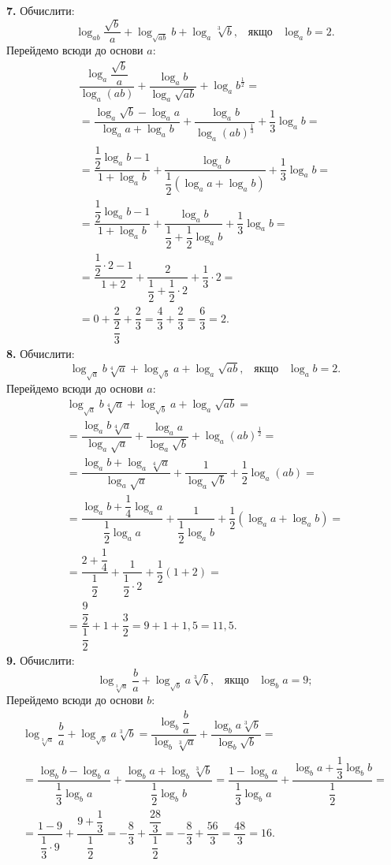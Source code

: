 \textbf{7.} Обчислити:
$$
\log_{ab}\dfrac{\sqrt{b}}{a}+\log_{\sqrt{ab}}b+\log_{a}\sqrt[3]{b}, \;\;\; \mbox{якщо} \;\;\; \log_{a}b=2.
$$
Перейдемо всюди до основи $a$:
\begin{multline*}
\dfrac{\log_{a}\dfrac{\sqrt{b}}{a}}{\log_{a}(ab)}+\dfrac{\log_{a}b}{\log_{a}\sqrt{ab}}+\log_{a}b^{\frac{1}{2}}=\\
=\dfrac{\log_{a}\sqrt{b}-\log_{a}a}{\log_{a}a+\log_{a}b}+\dfrac{\log_{a}b}{\log_{a}(ab)^{\frac{1}{3}}}+\dfrac{1}{3}\log_{a}b=\\
=\dfrac{\dfrac{1}{2}\log_{a}b-1}{1+\log_{a}b}+\dfrac{\log_{a}b}{\dfrac{1}{2}\left(\log_{a}a+\log_{a}b\right)}+\dfrac{1}{3}\log_{a}b=\\
=\dfrac{\dfrac{1}{2}\log_{a}b-1}{1+\log_{a}b}+\dfrac{\log_{a}b}{\dfrac{1}{2}+\dfrac{1}{2}\log_{a}b}+\dfrac{1}{3}\log_{a}b=\\
=\dfrac{\dfrac{1}{2}\cdot2-1}{1+2}+\dfrac{2}{\dfrac{1}{2}+\dfrac{1}{2}\cdot2}+\dfrac{1}{3}\cdot2=\\
=0+\dfrac{2}{\dfrac{2}{3}}+\dfrac{2}{3}=\dfrac{4}{3}+\dfrac{2}{3}=\dfrac{6}{3}=2.
\end{multline*}
\textbf{8.} Обчислити:
$$
\log_{\sqrt{a}}b\sqrt[4]{a}+\log_{\sqrt{b}}a+\log_{a}\sqrt{ab}, \;\;\; \mbox{якщо} \;\;\; \log_{a}b=2.
$$
Перейдемо всюди до основи $a$:
\begin{multline*}
\log_{\sqrt{a}}b\sqrt[4]{a}+\log_{\sqrt{b}}a+\log_{a}\sqrt{ab}=\\
=\dfrac{\log_{a}b\sqrt[4]{a}}{\log_{a}\sqrt{a}}+\dfrac{\log_{a}a}{\log_{a}\sqrt{b}}+\log_{a}(ab)^{\frac{1}{2}}=\\
=\dfrac{\log_{a}b+\log_{a}\sqrt[4]{a}}{\log_{a}\sqrt{a}}+\dfrac{1}{\log_{a}\sqrt{b}}+\dfrac{1}{2}\log_{a}(ab)=\\
=\dfrac{\log_{a}b+\dfrac{1}{4}\log_{a}a}{\dfrac{1}{2}\log_{a}a}+\dfrac{1}{\dfrac{1}{2}\log_{a}b}+\dfrac{1}{2}\left(\log_{a}a+\log_{a}b\right)=\\
=\dfrac{2+\dfrac{1}{4}}{\dfrac{1}{2}}+\dfrac{1}{\dfrac{1}{2}\cdot2}+\dfrac{1}{2}\left(1+2\right)=\\
=\dfrac{\dfrac{9}{2}}{\dfrac{1}{2}}+1+\dfrac{3}{2}=9+1+1,5=11,5.
\end{multline*}
\textbf{9.} Обчислити:
$$
\log_{\sqrt[3]{a}}\dfrac{b}{a}+\log_{\sqrt{b}}a\sqrt[3]{b}, \;\;\; \mbox{якщо} \;\;\; \log_{b}a=9;
$$
Перейдемо всюди до основи $b$:
\begin{multline*}
\log_{\sqrt[3]{a}}\dfrac{b}{a}+\log_{\sqrt{b}}a\sqrt[3]{b}=
\dfrac{\log_{b}\dfrac{b}{a}}{\log_{b}\sqrt[3]{a}}+\dfrac{\log_{b}a\sqrt[3]{b}}{\log_{b}\sqrt{b}}=\\
=\dfrac{\log_{b}b-\log_{b}a}{\dfrac{1}{3}\log_{b}a}+\dfrac{\log_{b}a+\log_{b}\sqrt[3]{b}}{\dfrac{1}{2}\log_{b}b}=
\dfrac{1-\log_{b}a}{\dfrac{1}{3}\log_{b}a}+\dfrac{\log_{b}a+\dfrac{1}{3}\log_{b}b}{\dfrac{1}{2}}=\\
=\dfrac{1-9}{\dfrac{1}{3}\cdot9}+\dfrac{9+\dfrac{1}{3}}{\dfrac{1}{2}}=
-\dfrac{8}{3}+\dfrac{\dfrac{28}{3}}{\dfrac{1}{2}}=-\dfrac{8}{3}+\dfrac{56}{3}=
\dfrac{48}{3}=16.
\end{multline*}
